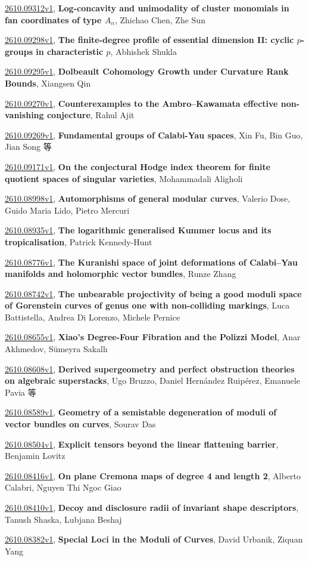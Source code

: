 \documentclass[9pt, a4paper]{article}
\theoremstyle{plain}
\theoremstyle{definition}
\theoremstyle{remark}
\newcommand{\arxiv}[3]{\href{https://arxiv.org/abs/#1}{#1}, \textbf{\textcolor{arxivblue}{#2}}, #3}
\begin{document}
\arxiv{2610.09312v1}{Log-concavity and unimodality of cluster monomials in fan coordinates of type $A_n$}{Zhichao Chen, Zhe Sun}

\arxiv{2610.09298v1}{The finite-degree profile of essential dimension II: cyclic $p$-groups in characteristic $p$}{Abhishek Shukla}

\arxiv{2610.09295v1}{Dolbeault Cohomology Growth under Curvature Rank Bounds}{Xiangsen Qin}

\arxiv{2610.09270v1}{Counterexamples to the Ambro--Kawamata effective non-vanishing conjecture}{Rahul Ajit}

\arxiv{2610.09269v1}{Fundamental groups of Calabi-Yau spaces}{Xin Fu, Bin Guo, Jian Song 等}

\arxiv{2610.09171v1}{On the conjectural Hodge index theorem for finite quotient spaces of singular varieties}{Mohammadali Aligholi}

\arxiv{2610.08998v1}{Automorphisms of general modular curves}{Valerio Dose, Guido Maria Lido, Pietro Mercuri}

\arxiv{2610.08935v1}{The logarithmic generalised Kummer locus and its tropicalisation}{Patrick Kennedy-Hunt}

\arxiv{2610.08776v1}{The Kuranishi space of joint deformations of Calabi--Yau manifolds and holomorphic vector bundles}{Runze Zhang}

\arxiv{2610.08742v1}{The unbearable projectivity of being a good moduli space of Gorenstein curves of genus one with non-colliding markings}{Luca Battistella, Andrea Di Lorenzo, Michele Pernice}

\arxiv{2610.08655v1}{Xiao's Degree-Four Fibration and the Polizzi Model}{Anar Akhmedov, Sümeyra Sakallı}

\arxiv{2610.08608v1}{Derived supergeometry and perfect obstruction theories on algebraic superstacks}{Ugo Bruzzo, Daniel Hernández Ruipérez, Emanuele Pavia 等}

\arxiv{2610.08589v1}{Geometry of a semistable degeneration of moduli of vector bundles on curves}{Sourav Das}

\arxiv{2610.08504v1}{Explicit tensors beyond the linear flattening barrier}{Benjamin Lovitz}

\arxiv{2610.08416v1}{On plane Cremona maps of degree 4 and length 2}{Alberto Calabri, Nguyen Thi Ngoc Giao}

\arxiv{2610.08410v1}{Decoy and disclosure radii of invariant shape descriptors}{Tanush Shaska, Lubjana Beshaj}

\arxiv{2610.08382v1}{Special Loci in the Moduli of Curves}{David Urbanik, Ziquan Yang}
\end{document}

